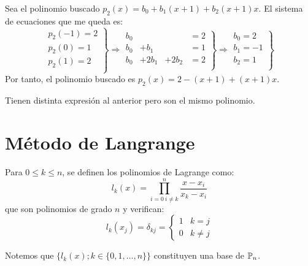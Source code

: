\begin{ejemplo}
\begin{itemize}
        Sea el polinomio buscado $p_2(x) = b_0 + b_1(x+1) + b_2(x+1)x$. El sistema de ecuaciones que me queda es:
        \begin{equation*}
            \left. \begin{array}{c}
                p_2(-1)=2 \\
                p_2(0)=1 \\
                p_2(1)=2 \\
            \end{array} \right\} \Longrightarrow
            \left. \begin{array}{cccc}
                b_0 &  &  & =2 \\
                b_0 & + b_1&&=1 \\
                b_0 & + 2b_1 &+2b_2 &= 2 \\
            \end{array} \right\} \Longrightarrow
            \left. \begin{array}{c}
                b_0=2 \\
                b_1=-1 \\
                b_2=1 \\
            \end{array} \right\}
        \end{equation*}
        Por tanto, el polinomio buscado es $p_2(x)=2 - (x+1) + (x+1)x$.
    \end{itemize}

    Tienen distinta expresión al anterior pero son el mismo polinomio.
\end{ejemplo}


\section{Método de Langrange}
\begin{definicion}
    Para $0\leq k \leq n$, se definen los polinomios de Lagrange como:
    $$l_k(x)=\prod_{i=0~i\neq k}^n \dfrac{x-x_i}{x_k-x_i}$$
    que son polinomios de grado $n$ y verifican:
    $$l_k(x_j) = \delta_{kj} = \left\{
        \begin{array}{cc}
            1 & k=j     \\
            0 & k\neq j
        \end{array}\right.
    $$

    \noindent
    Notemos que $\{l_k(x); k\in \{0, 1, \ldots, n\}\}$ constituyen una base de $\mathbb{P}_n$.
\end{definicion}

